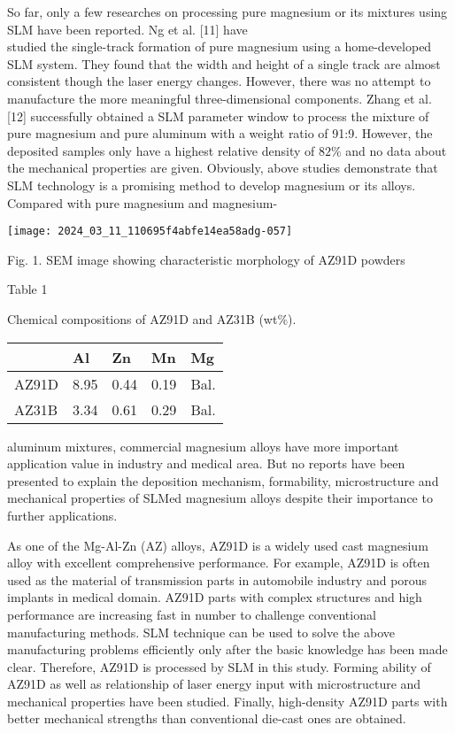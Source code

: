\documentclass[10pt]{article}
\begin{document}
So far, only a few researches on processing pure magnesium or its mixtures using SLM have been reported. Ng et al. [11] have\\
studied the single-track formation of pure magnesium using a home-developed SLM system. They found that the width and height of a single track are almost consistent though the laser energy changes. However, there was no attempt to manufacture the more meaningful three-dimensional components. Zhang et al. [12] successfully obtained a SLM parameter window to process the mixture of pure magnesium and pure aluminum with a weight ratio of 91:9. However, the deposited samples only have a highest relative density of $82 \%$ and no data about the mechanical properties are given. Obviously, above studies demonstrate that SLM technology is a promising method to develop magnesium or its alloys. Compared with pure magnesium and magnesium-

\begin{center}
\texttt{[image: 2024\_03\_11\_110695f4abfe14ea58adg-057]}
\end{center}

Fig. 1. SEM image showing characteristic morphology of AZ91D powders

Table 1

Chemical compositions of AZ91D and AZ31B (wt\%).

\begin{center}
\begin{tabular}{lllll}
\hline
 & Al & Zn & Mn & Mg \\
\hline
AZ91D & 8.95 & 0.44 & 0.19 & Bal. \\
AZ31B & 3.34 & 0.61 & 0.29 & Bal. \\
\hline
\end{tabular}
\end{center}

aluminum mixtures, commercial magnesium alloys have more important application value in industry and medical area. But no reports have been presented to explain the deposition mechanism, formability, microstructure and mechanical properties of SLMed magnesium alloys despite their importance to further applications.

As one of the Mg-Al-Zn (AZ) alloys, AZ91D is a widely used cast magnesium alloy with excellent comprehensive performance. For example, AZ91D is often used as the material of transmission parts in automobile industry and porous implants in medical domain. AZ91D parts with complex structures and high performance are increasing fast in number to challenge conventional manufacturing methods. SLM technique can be used to solve the above manufacturing problems efficiently only after the basic knowledge has been made clear. Therefore, AZ91D is processed by SLM in this study. Forming ability of AZ91D as well as relationship of laser energy input with microstructure and mechanical properties have been studied. Finally, high-density AZ91D parts with better mechanical strengths than conventional die-cast ones are obtained.
\end{document}

